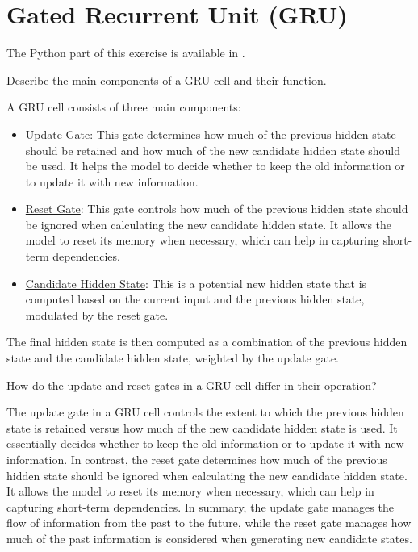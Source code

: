 \section{Gated Recurrent Unit (GRU)}

The Python part of this exercise is available in .\\


\begin{ejercicio}
    Describe the main components of a GRU cell and their function.

    A GRU cell consists of three main components:
    \begin{itemize}
        \item \ul{Update Gate}: This gate determines how much of the previous hidden state should be retained and how much of the new candidate hidden state should be used. It helps the model to decide whether to keep the old information or to update it with new information.
        \item \ul{Reset Gate}: This gate controls how much of the previous hidden state should be ignored when calculating the new candidate hidden state. It allows the model to reset its memory when necessary, which can help in capturing short-term dependencies.
        \item \ul{Candidate Hidden State}: This is a potential new hidden state that is computed based on the current input and the previous hidden state, modulated by the reset gate.
    \end{itemize}
    The final hidden state is then computed as a combination of the previous hidden state and the candidate hidden state, weighted by the update gate.
\end{ejercicio}
\begin{ejercicio}
    How do the update and reset gates in a GRU cell differ in their operation?

    The update gate in a GRU cell controls the extent to which the previous hidden state is retained versus how much of the new candidate hidden state is used. It essentially decides whether to keep the old information or to update it with new information. In contrast, the reset gate determines how much of the previous hidden state should be ignored when calculating the new candidate hidden state. It allows the model to reset its memory when necessary, which can help in capturing short-term dependencies. In summary, the update gate manages the flow of information from the past to the future, while the reset gate manages how much of the past information is considered when generating new candidate states.
\end{ejercicio}
